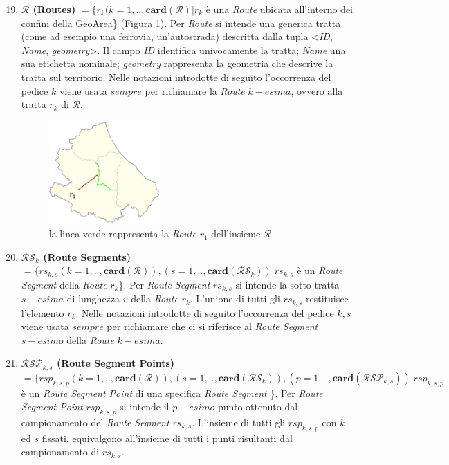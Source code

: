 \begin{enumerate}
	\setcounter{enumi}{18}
	\item \textbf{$ \mathcal{R} $ (Routes)} $ = \{r_k(k=1,..,\mathbf{card}(\mathcal{R}) | r_k $ è una \textit{Route} ubicata all'interno dei confini della  GeoArea\} (Figura \ref{img:route}). Per \textit{Route} si intende una generica tratta (come ad esempio una ferrovia, un'autostrada) descritta dalla tupla <\textit{ID}, \textit{Name}, \textit{geometry}>. Il campo \textit{ID} identifica univocamente la tratta; \textit{Name} una sua etichetta nominale; \textit{geometry} rappresenta la geometria che descrive la tratta sul territorio. Nelle notazioni introdotte di seguito l'occorrenza del pedice $k$ viene usata $sempre$ per richiamare la \textit{Route} $k-esima$, ovvero alla tratta $r_k$ di $ \mathcal{R} $.
	
		\begin{figure}[h]
		\centering
		\includegraphics[width=0.4\textwidth]{images/routes1}
		\caption{la linea verde rappresenta la \textit{Route} $r_1$ dell'insieme $ \mathcal{R} $}
		\label{img:route}
		\end{figure}
	
	\item \textbf{$ \mathcal{RS}_k $ (Route Segments)} $ = \{rs_{k,s}(k=1,..,\mathbf{card}(\mathcal{R})),(s=1,..,\mathbf{card}(\mathcal{RS}_k))  | rs_{k,s} $ è un \textit{Route Segment} della \textit{Route} $r_k$\}. Per \textit{Route Segment} $rs_{k,s}$ si intende la sotto-tratta $s-esima$ di lunghezza $v$ della \textit{Route} $r_k$. L'unione di tutti gli $rs_{k,s}$ restituisce l'elemento $r_k$. Nelle notazioni introdotte di seguito l'occorrenza del pedice $k,s$ viene usata $sempre$ per richiamare che ci si riferisce al \textit{Route Segment} $s-esimo$ della \textit{Route} $k-esima$.
		
	\item \textbf{$ \mathcal{RSP}_{k,s} $ (Route Segment Points)} $ = \{rsp_{k,s,p}(k=1,..,\mathbf{card}(\mathcal{R})),(s=1,..,\mathbf{card}(\mathcal{RS}_k)),(p=1,..,\mathbf{card}(\mathcal{RSP}_{k,s}))  | rsp_{k,s,p} $ è un \textit{Route Segment Point} di una specifica \textit{Route Segment} \}. Per \textit{Route Segment Point} $rsp_{k,s,p}$ si intende il $p-esimo$ punto ottenuto dal campionamento del \textit{Route Segment} $rs_{k,s}$. L'insieme di tutti gli $rsp_{k,s,p}$ con $k$ ed $s$ fissati, equivalgono all'insieme di tutti i punti risultanti dal campionamento di $rs_{k,s}$.
	
\end{enumerate}


